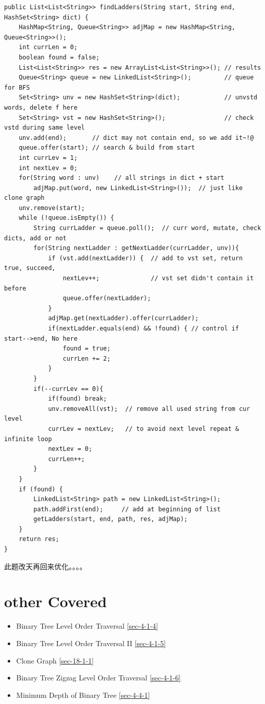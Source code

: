 \documentclass[12pt]{book}
\begin{document}
\begin{lstlisting}
public List<List<String>> findLadders(String start, String end, HashSet<String> dict) {
    HashMap<String, Queue<String>> adjMap = new HashMap<String, Queue<String>>(); 
    int currLen = 0;
    boolean found = false;
    List<List<String>> res = new ArrayList<List<String>>(); // results
    Queue<String> queue = new LinkedList<String>();         // queue for BFS
    Set<String> unv = new HashSet<String>(dict);            // unvstd words, delete f here
    Set<String> vst = new HashSet<String>();                // check vstd during same level
    unv.add(end);       // dict may not contain end, so we add it~!@
    queue.offer(start); // search & build from start
    int currLev = 1;
    int nextLev = 0;
    for(String word : unv)    // all strings in dict + start
        adjMap.put(word, new LinkedList<String>());  // just like clone graph
    unv.remove(start);
    while (!queue.isEmpty()) {
        String currLadder = queue.poll();  // curr word, mutate, check dicts, add or not
        for(String nextLadder : getNextLadder(currLadder, unv)){ 
            if (vst.add(nextLadder)) {  // add to vst set, return true, succeed, 
                nextLev++;              // vst set didn't contain it before
                queue.offer(nextLadder);
            }
            adjMap.get(nextLadder).offer(currLadder); 
            if(nextLadder.equals(end) && !found) { // control if start-->end, No here
                found = true;
                currLen += 2;
            }
        } 
        if(--currLev == 0){
            if(found) break;
            unv.removeAll(vst);  // remove all used string from cur level 
            currLev = nextLev;   // to avoid next level repeat & infinite loop
            nextLev = 0;
            currLen++;
        }
    }
    if (found) {
        LinkedList<String> path = new LinkedList<String>();
        path.addFirst(end);     // add at beginning of list
        getLadders(start, end, path, res, adjMap);
    }
    return res;
}
\end{lstlisting}

此题改天再回来优化。。。。

\section{other Covered}
\label{sec-10-3}
\begin{itemize}
\item Binary Tree Level Order Traversal
\ref{sec-4-1-4}
\item Binary Tree Level Order Traversal II
\ref{sec-4-1-5}
\item Clone Graph        
\ref{sec-18-1-1}
\item Binary Tree Zigzag Level Order Traversal
\ref{sec-4-1-6}
\item Minimum Depth of Binary Tree
\ref{sec-4-4-1}
\end{itemize}
\end{document}
